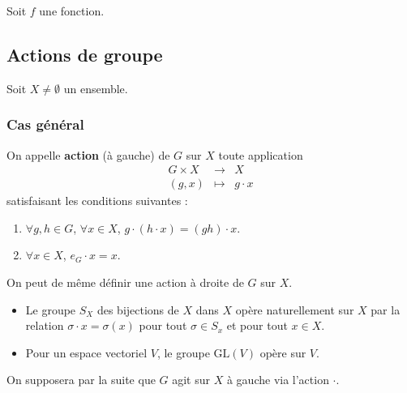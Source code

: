 



  Soit $f$ une fonction.

  \subsection{Actions de groupe}

  Soit $X \neq \emptyset$ un ensemble.

  \subsubsection{Cas général}

  

  \begin{definition}
    On appelle \textbf{action} (à gauche) de $G$ sur $X$ toute application
    \[
    \begin{array}{ccc}
      G \times X &\rightarrow& X \\
      (g, x) &\mapsto& g \cdot x
    \end{array}
    \]
    satisfaisant les conditions suivantes :
    \begin{enumerate}[label=(\roman*)]
      \item $\forall g, h \in G$, $\forall x \in X$, $g \cdot (h \cdot x) = (gh) \cdot x$.
      \item $\forall x \in X$, $e_G \cdot x = x$.
    \end{enumerate}
  \end{definition}

  \begin{remark}
    On peut de même définir une action à droite de $G$ sur $X$.
  \end{remark}

  \begin{example}
    \begin{itemize}
      \item Le groupe $S_X$ des bijections de $X$ dans $X$ opère naturellement sur $X$ par la relation $\sigma \cdot x = \sigma(x)$ pour tout $\sigma \in S_x$ et pour tout $x \in X$.
      \item Pour un espace vectoriel $V$, le groupe $\mathrm{GL}(V)$ opère sur $V$.
    \end{itemize}
  \end{example}

  On supposera par la suite que $G$ agit sur $X$ à gauche via l'action $\cdot$.


